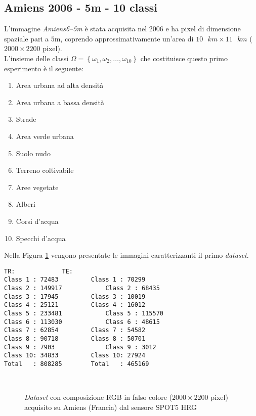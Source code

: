 \subsection{Amiens 2006 - 5m - 10 classi}
L'immagine \emph{Amiens6--5m} è stata acquisita nel 2006 e ha pixel di dimensione spaziale pari a $5 \text{m}$, coprendo approssimativamente un'area di $10\text{ }km\times11\text{ }km$ ($2000\times2200$ pixel).\\
L'insieme delle classi $\Omega=\left\lbrace\omega_1,\omega_2,\ldots,\omega_{10}\right\rbrace$ che costituisce questo primo esperimento è il seguente:
\begin{enumerate}
\item Area urbana ad alta densità
\item Area urbana a bassa densità
\item Strade
\item Area verde urbana 
\item Suolo nudo
\item Terreno coltivabile
\item Aree vegetate
\item Alberi
\item Corsi d'acqua
\item Specchi d'acqua
\end{enumerate}
Nella Figura \ref{fig: Amiens65m} vengono presentate le immagini caratterizzanti il primo \emph{dataset}. 
\begin{lstlisting}[title={Distribuzione dei pixel di training (TR) e test (TE) classe per classe.},
                   label=lst:esempio, frame=lines]
TR:				TE:
Class 1 : 72483 		Class 1 : 70299
Class 2 : 149917 	        Class 2 : 68435
Class 3 : 17945 		Class 3 : 10019
Class 4 : 25121 		Class 4 : 16012
Class 5 : 233481 	        Class 5 : 115570
Class 6 : 113030 	        Class 6 : 48615
Class 7 : 62854 		Class 7 : 54582
Class 8 : 90718 		Class 8 : 50701
Class 9 : 7903 		        Class 9 : 3012
Class 10: 34833 		Class 10: 27924
Total   : 808285		Total   : 465169
\end{lstlisting}
\clearpage
\begin{figure}[!ht]
   \center
   \\%
     \hspace{4mm}
    \caption{\emph{Dataset} con composizione RGB in falso colore ($2000\times2200$ pixel) acquisito su Amiens (Francia) dal sensore \textsc{SPOT5 HRG}}
    \label{fig: Amiens65m}
  \end{figure}
  
